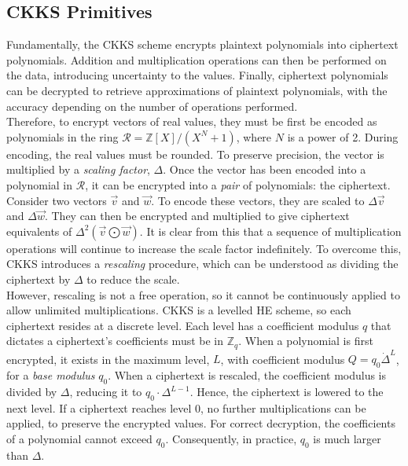 \subsection{CKKS Primitives}
\label{sec:CKKS}
\setlength{\leftskip}{0.5cm}
\indent \indent
Fundamentally, the CKKS scheme encrypts plaintext polynomials into ciphertext polynomials. Addition and multiplication operations can then be performed on the data, introducing uncertainty to the values. Finally, ciphertext polynomials can be decrypted to retrieve approximations of plaintext polynomials, with the accuracy depending on the number of operations performed.
\smallskip \\ \indent
Therefore, to encrypt vectors of real values, they must be first be encoded as polynomials in the ring $\mathcal{R} = \mathbb{Z}[X] / (X^N + 1)$, where $N$ is a power of 2. During encoding, the real values must be rounded. To preserve precision, the vector is multiplied by a \textit{scaling factor}, $\Delta$. Once the vector has been encoded into a polynomial in $\mathcal{R}$, it can be encrypted into a \textit{pair} of polynomials: the ciphertext.
\smallskip \\ \indent
Consider two vectors $\vec{v}$ and $\vec{w}$. To encode these vectors, they are scaled to $\Delta \vec{v}$ and $\Delta \vec{w}$.  They can then be encrypted and multiplied to give ciphertext equivalents of $\Delta^2 (\vec{v} \bigodot \vec{w})$. It is clear from this that a sequence of multiplication operations will continue to increase the scale factor indefinitely. To overcome this, CKKS introduces a \textit{rescaling} procedure, which can be understood as dividing the ciphertext by $\Delta$ to reduce the scale.
\smallskip \\ \indent
However, rescaling is not a free operation, so it cannot be continuously applied to allow unlimited multiplications. CKKS is a levelled HE scheme, so each ciphertext resides at a discrete level. Each level has a coefficient modulus $q$ that dictates a ciphertext's coefficients must be in $\mathbb{Z}_q$. When a polynomial is first encrypted, it exists in the maximum level, $L$, with coefficient modulus $Q = q_0 \dot \Delta^L$, for a \textit{base modulus} $q_0$. When a ciphertext is rescaled, the coefficient modulus is divided by $\Delta$, reducing it to $q_0 \cdot \Delta^{L-1}$. Hence, the ciphertext is lowered to the next level. If a ciphertext reaches level 0, no further multiplications can be applied, to preserve the encrypted values. For correct decryption, the coefficients of a polynomial cannot exceed $q_0$. Consequently, in practice, $q_0$ is much larger than $\Delta$.

